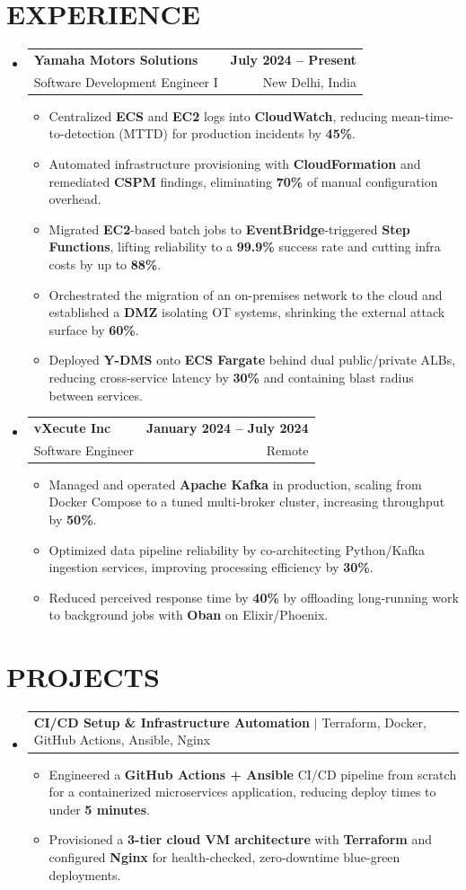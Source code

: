 \documentclass[letterpaper,10pt]{article}
\makeatletter
\renewcommand{\normalsize}{%
  \fontsize{10.1}{12.25}\selectfont
}
\newcommand{\resumeItem}[1]{
  \item\normalsize{
    {#1}
  }
}
\newcommand{\resumeSubheading}[4]{
  \item
    \begin{tabular*}{1.0\textwidth}[t]{l@{\extracolsep{\fill}}r}
      \textbf{\normalsize#1} & \textbf{\normalsize#2} \\
      {\normalsize#3} & {\normalsize#4} \\
    \end{tabular*}\vspace{1pt}
}
\newcommand{\resumeProjectHeading}[2]{
  \item
    \begin{tabular*}{1.0\textwidth}{l@{\extracolsep{\fill}}r}
      \normalsize#1 & \textbf{\normalsize#2}\\
    \end{tabular*}\vspace{2pt}
}
\newcommand{\resumeSubHeadingListStart}{\begin{itemize}[leftmargin=0.0in, label={}, itemsep=6pt, topsep=2pt]}
\newcommand{\resumeSubHeadingListEnd}{\end{itemize}}
\newcommand{\resumeItemListStart}{\begin{itemize}}
\newcommand{\resumeItemListEnd}{\end{itemize}\vspace{-3pt}}
\makeatother
\begin{document}
\section{EXPERIENCE}
  \resumeSubHeadingListStart

    \resumeSubheading
      {Yamaha Motors Solutions}{July 2024 -- Present}
      {Software Development Engineer I}{New Delhi, India}
      \resumeItemListStart
        \resumeItem{Centralized \textbf{ECS} and \textbf{EC2} logs into \textbf{CloudWatch}, reducing mean-time-to-detection (MTTD) for production incidents by \textbf{45\%}.}
        \resumeItem{Automated infrastructure provisioning with \textbf{CloudFormation} and remediated \textbf{CSPM} findings, eliminating \textbf{70\%} of manual configuration overhead.}
        \resumeItem{Migrated \textbf{EC2}-based batch jobs to \textbf{EventBridge}-triggered \textbf{Step Functions}, lifting reliability to a \textbf{99.9\%} success rate and cutting infra costs by up to \textbf{88\%}.}
        \resumeItem{Orchestrated the migration of an on-premises network to the cloud and established a \textbf{DMZ} isolating OT systems, shrinking the external attack surface by \textbf{60\%}.}
        \resumeItem{Deployed \textbf{Y-DMS} onto \textbf{ECS Fargate} behind dual public/private ALBs, reducing cross-service latency by \textbf{30\%} and containing blast radius between services.}
      \resumeItemListEnd

    \resumeSubheading
      {vXecute Inc}{January 2024 -- July 2024}
      {Software Engineer}{Remote}
      \resumeItemListStart
        \resumeItem{Managed and operated \textbf{Apache Kafka} in production, scaling from Docker Compose to a tuned multi-broker cluster, increasing throughput by \textbf{50\%}.}
        \resumeItem{Optimized data pipeline reliability by co-architecting Python/Kafka ingestion services, improving processing efficiency by \textbf{30\%}.}
        \resumeItem{Reduced perceived response time by \textbf{40\%} by offloading long-running work to background jobs with \textbf{Oban} on Elixir/Phoenix.}
      \resumeItemListEnd

  \resumeSubHeadingListEnd

\section{PROJECTS}
  \resumeSubHeadingListStart
    \resumeProjectHeading
      {\textbf{CI/CD Setup \& Infrastructure Automation} $|$ \textnormal{Terraform, Docker, GitHub Actions, Ansible, Nginx}}{}
      \resumeItemListStart
        \resumeItem{Engineered a \textbf{GitHub Actions + Ansible} CI/CD pipeline from scratch for a containerized microservices application, reducing deploy times to under \textbf{5 minutes}.}
        \resumeItem{Provisioned a \textbf{3-tier cloud VM architecture} with \textbf{Terraform} and configured \textbf{Nginx} for health-checked, zero-downtime blue-green deployments.}
      \resumeItemListEnd
  \resumeSubHeadingListEnd
\end{document}
